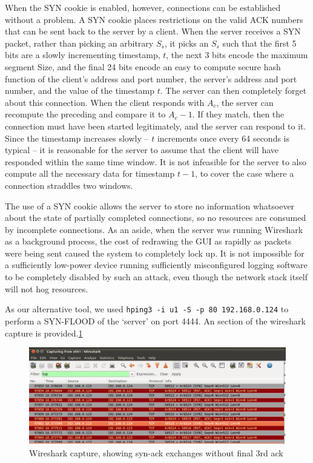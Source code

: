 When the SYN cookie is enabled, however, connections can be established without a problem. A SYN cookie places
restrictions on the valid ACK numbers that can be sent back to the server by a client. When the server receives a SYN
packet, rather than picking an arbitrary $S_s$, it picks an $S_s$ such that the first 5 bits are a slowly incrementing
timestamp, $t$, the next 3 bits encode the maximum segment Size, and the final 24 bits encode an easy to compute secure
hash function of the client's address and port number, the server's address and port number, and the value of the
timestamp $t$. The server can then completely forget about this connection. When the client responds with $A_c$, the
server can recompute the preceding and compare it to $A_c-1$. If they match, then the connection must have been started
legitimately, and the server can respond to it. Since the timestamp increases slowly -- $t$ increments once every 64
seconds is typical -- it is reasonable for the server to assume that the client will have responded within the same time
window. It is not infeasible for the server to also compute all the necessary data for timestamp $t-1$, to cover the
case where a connection straddles two windows.

The use of a SYN cookie allows the server to store no information whatsoever about the state of partially completed
connections, so no resources are consumed by incomplete connections. As an aside, when the server was running Wireshark
as a background process, the cost of redrawing the GUI as rapidly as packets were being sent caused the system to
completely lock up. It is not impossible for a sufficiently low-power device running sufficiently misconfigured logging
software to be completely disabled by such an attack, even though the network stack itself will not hog resources.

As our alternative tool, we used {\tt hping3 -i u1 -S -p 80 192.168.0.124} to perform a SYN-FLOOD of the `server' on
port 4444. An section of the wireshark capture is provided.\ref{fig:ws-rst}

\begin{figure}[h]
    \centering
    \includegraphics[width=.75\linewidth]{images/ws-rst-crop.png}
    \caption{Wireshark capture, showing syn-ack exchanges without final 3rd ack}
    \label{fig:ws-rst}
\end{figure}

